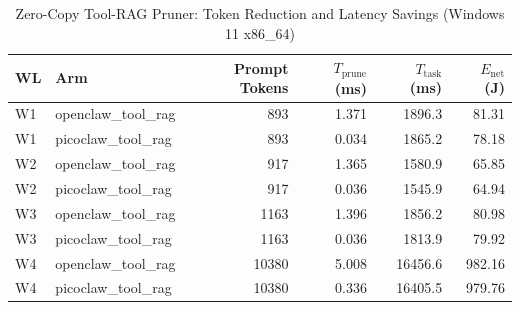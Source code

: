 \begin{table}[t]
\centering\small
\caption{Zero-Copy Tool-RAG Pruner: Token Reduction and Latency Savings (Windows 11 x86_64)}
\label{tab:Windows_tool_rag}
\begin{tabular}{llrrrr}
\toprule
WL & Arm & Prompt Tokens & $T_{\text{prune}}$ (ms) & $T_{\text{task}}$ (ms) & $E_{\text{net}}$ (J) \\
\midrule
W1 & openclaw\_tool\_rag & 893 & 1.371 & 1896.3 & 81.31 \\
W1 & picoclaw\_tool\_rag & 893 & 0.034 & 1865.2 & 78.18 \\
W2 & openclaw\_tool\_rag & 917 & 1.365 & 1580.9 & 65.85 \\
W2 & picoclaw\_tool\_rag & 917 & 0.036 & 1545.9 & 64.94 \\
W3 & openclaw\_tool\_rag & 1163 & 1.396 & 1856.2 & 80.98 \\
W3 & picoclaw\_tool\_rag & 1163 & 0.036 & 1813.9 & 79.92 \\
W4 & openclaw\_tool\_rag & 10380 & 5.008 & 16456.6 & 982.16 \\
W4 & picoclaw\_tool\_rag & 10380 & 0.336 & 16405.5 & 979.76 \\
\bottomrule
\end{tabular}
\end{table}
